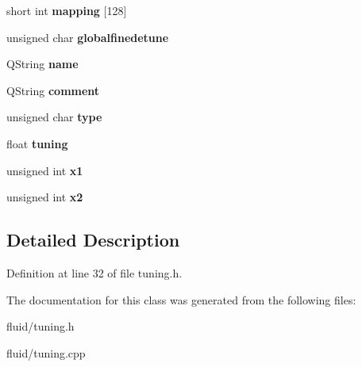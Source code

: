 \begin{DoxyCompactItemize}
short int {\bfseries mapping} \mbox{[}128\mbox{]}
\item 
\mbox{\label{class_tuning_a0bad3bd74b54048ca4d6c83cf2dcd27d}} 
unsigned char {\bfseries globalfinedetune}
\item 
\mbox{\label{class_tuning_aa53f667e6a108eb62d55868bf0758157}} 
Q\+String {\bfseries name}
\item 
\mbox{\label{class_tuning_a2e1bbf8bb37fa05258e3e4a0fd621cd4}} 
Q\+String {\bfseries comment}
\item 
\mbox{\label{class_tuning_af6f7b70aec7a80370a1c1b4fc2089560}} 
unsigned char {\bfseries type}
\item 
\mbox{\label{class_tuning_aca03ff01ae3a013784c66e8f97f8109e}} 
float {\bfseries tuning}
\item 
\mbox{\label{class_tuning_af2082b98343f5b1d8c0f3e0e21091f2c}} 
unsigned int {\bfseries x1}
\item 
\mbox{\label{class_tuning_a66868bb5d50bef1737930e79ea257829}} 
unsigned int {\bfseries x2}
\end{DoxyCompactItemize}


\subsection{Detailed Description}


Definition at line 32 of file tuning.\+h.



The documentation for this class was generated from the following files\+:\begin{DoxyCompactItemize}
\item 
fluid/tuning.\+h\item 
fluid/tuning.\+cpp\end{DoxyCompactItemize}
